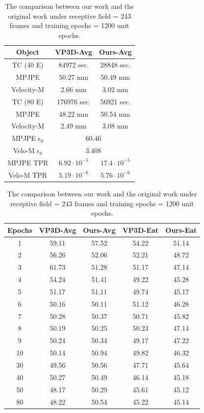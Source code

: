 \documentclass[10pt,twocolumn,letterpaper]{article}
\begin{document}
\begin{table}
	\centering
	\begin{tabular}{ccc}
	\hline
	Object & VP3D-Avg & Ours-Avg \\
	\hline
	TC (40 E)& 84972 sec. & 28848 sec.\\
	MPJPE& 50.27 mm & 50.49 mm\\
	Velocity-M& 2.66 mm & 3.02 mm  \\
	\hline
	TC (80 E)& 176976 sec. & 56921 sec.\\
	MPJPE&  48.22 mm & 50.54 mm\\
	Velocity-M& 2.49 mm & 3.08 mm  \\
	\hline
	MPJPE $\epsilon_0$ & \multicolumn{2}{c}{60.46} \\
	Velo-M $\epsilon_0$ & \multicolumn{2}{c}{3.408} \\
	MPJPE TPR & $6.92\cdot 10^{-5}$ & $17.4\cdot 10^{-5}$ \\
	Velo-M TPR & $5.19\cdot 10^{-6}$ & $5.76\cdot 10^{-6}$ \\
	\hline
	\end{tabular}
	\caption{The property cluster with receptive field = 243 frames and training epochs = 1200 unit epochs.}

	\centering
	\begin{tabular}{ccccc}
	\hline
	Epochs & VP3D-Avg & Ours-Avg & VP3D-Eat & Ours-Eat\\
	\hline
	1 & 59.11 & 57.52 & 54.22 & 51.14 \\
	2 & 56.26 & 52.06 & 52.21 & 48.72 \\
	3 & 61.73 & 51.28 & 51.17 & 47.14 \\
	4 & 54.24 & 51.41 & 49.22 & 45.28 \\
	5 & 51.17 & 51.11 & 49.74 & 45.17\\
	6 & 50.16 & 50.11 & 51.12 & 46.28\\
	7 & 50.28 & 50.37 & 50.71 & 45.82\\
	8 & 50.19 & 50.25 & 50.23 & 47.14 \\
	9 & 50.24 & 50.34 & 49.17 & 47.22\\
	10 & 50.14 & 50.94 & 49.82 & 46.32\\
	30 & 49.56 & 50.56 & 47.71 & 45.64\\
	40 & 50.27 & 50.49 & 46.14 & 45.18\\
	50 & 48.17 & 50.29 & 45.61 & 45.12\\
	80 & 48.22 & 50.54 & 45.22 & 45.14 \\
	\hline
\end{tabular}

\caption{The comparison between our work and the original work under receptive field = 243 frames and training epochs = 1200 unit epochs.}
\label{tab:time_related}
\end{table}
\end{document}
